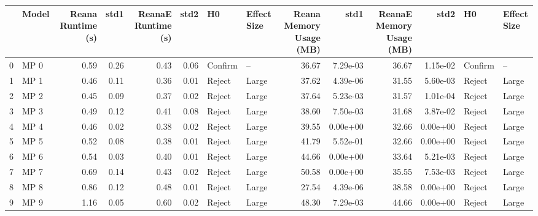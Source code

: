 \begin{tabular}{llrrrrllrrrrll}
\toprule
{} &  Model &  Reana Runtime (s) &  std1 &  ReanaE Runtime (s) &  std2 &       H0 & Effect Size &  Reana Memory Usage (MB) &      std1 &  ReanaE Memory Usage (MB) &      std2 &       H0 & Effect Size \\
\midrule
0  &   MP 0 &               0.59 &  0.26 &                0.43 &  0.06 &  Confirm &          -- &                    36.67 &  7.29e-03 &                     36.67 &  1.15e-02 &  Confirm &          -- \\
1  &   MP 1 &               0.46 &  0.11 &                0.36 &  0.01 &   Reject &       Large &                    37.62 &  4.39e-06 &                     31.55 &  5.60e-03 &   Reject &       Large \\
2  &   MP 2 &               0.45 &  0.09 &                0.37 &  0.02 &   Reject &       Large &                    37.64 &  5.23e-03 &                     31.57 &  1.01e-04 &   Reject &       Large \\
3  &   MP 3 &               0.49 &  0.12 &                0.41 &  0.08 &   Reject &       Large &                    38.60 &  7.50e-03 &                     31.68 &  3.87e-02 &   Reject &       Large \\
4  &   MP 4 &               0.46 &  0.02 &                0.38 &  0.02 &   Reject &       Large &                    39.55 &  0.00e+00 &                     32.66 &  0.00e+00 &   Reject &       Large \\
5  &   MP 5 &               0.52 &  0.08 &                0.38 &  0.01 &   Reject &       Large &                    41.79 &  5.52e-01 &                     32.66 &  0.00e+00 &   Reject &       Large \\
6  &   MP 6 &               0.54 &  0.03 &                0.40 &  0.01 &   Reject &       Large &                    44.66 &  0.00e+00 &                     33.64 &  5.21e-03 &   Reject &       Large \\
7  &   MP 7 &               0.69 &  0.14 &                0.43 &  0.02 &   Reject &       Large &                    50.58 &  0.00e+00 &                     35.55 &  7.53e-03 &   Reject &       Large \\
8  &   MP 8 &               0.86 &  0.12 &                0.48 &  0.01 &   Reject &       Large &                    27.54 &  4.39e-06 &                     38.58 &  0.00e+00 &   Reject &       Large \\
9  &   MP 9 &               1.16 &  0.05 &                0.60 &  0.02 &   Reject &       Large &                    48.30 &  7.29e-03 &                     44.66 &  0.00e+00 &   Reject &       Large \\

\end{tabular}
